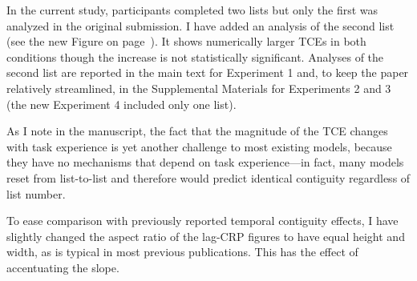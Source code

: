 \documentclass[12pt]{article}
\begin{document}
\begin{enumerate}
	In the current study, participants completed two lists but only the first was analyzed in the original submission. I have added an analysis of the second list (see the new Figure on page~\pageref{TODO-6}). It shows numerically larger TCEs in both conditions though the increase is not statistically significant. Analyses of the second list are reported in the main text for Experiment 1 and, to keep the paper relatively streamlined, in the Supplemental Materials for Experiments 2 and 3 (the new Experiment 4 included only one list).

	As I note in the manuscript, the fact that the magnitude of the TCE changes with task experience is yet another challenge to most existing models, because they have no mechanisms that depend on task experience---in fact, many models reset from list-to-list and therefore would predict identical contiguity regardless of list number.

	To ease comparison with previously reported temporal contiguity effects, I have slightly changed the aspect ratio of the lag-CRP figures to have equal height and width, as is typical in most previous publications. This has the effect of accentuating the slope. 


\end{enumerate}
\end{document}
